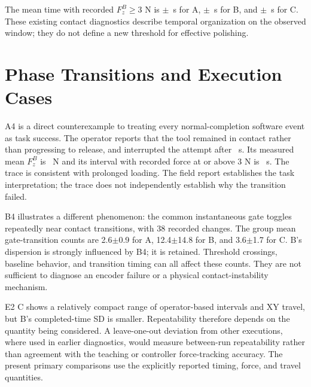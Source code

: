 The mean time with recorded \(F_z^B\geq3\) N is \EtwoAContactTime\(\pm\)\EtwoAContactTimeSD~s for A, \EtwoBContactTime\(\pm\)\EtwoBContactTimeSD~s for B, and \EtwoCContactTime\(\pm\)\EtwoCContactTimeSD~s for C. These existing contact diagnostics describe temporal organization on the observed window; they do not define a new threshold for effective polishing.


\section{Phase Transitions and Execution Cases}
A4 is a direct counterexample to treating every normal-completion software event as task success. The operator reports that the tool remained in contact rather than progressing to release, and interrupted the attempt after \AfourInterval~s. Its measured mean \(F_z^B\) is \AfourMeanForce~N and its interval with recorded force at or above 3 N is \AfourContactTime~s. The trace is consistent with prolonged loading. The field report establishes the task interpretation; the trace does not independently establish why the transition failed.


B4 illustrates a different phenomenon: the common instantaneous gate toggles repeatedly near contact transitions, with 38 recorded changes. The group mean gate-transition counts are 2.6\(\pm\)0.9 for A, 12.4\(\pm\)14.8 for B, and 3.6\(\pm\)1.7 for C. B's dispersion is strongly influenced by B4; it is retained. Threshold crossings, baseline behavior, and transition timing can all affect these counts. They are not sufficient to diagnose an encoder failure or a physical contact-instability mechanism.

E2 C shows a relatively compact range of operator-based intervals and XY travel, but B's completed-time SD is smaller. Repeatability therefore depends on the quantity being considered. A leave-one-out deviation from other executions, where used in earlier diagnostics, would measure between-run repeatability rather than agreement with the teaching or controller force-tracking accuracy. The present primary comparisons use the explicitly reported timing, force, and travel quantities.

